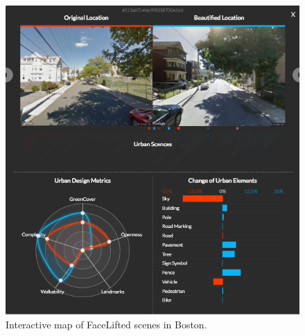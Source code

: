 

\begin{figure}[t!]
	\centering
	\includegraphics[width=\columnwidth]{Plot/UI.png}
	\caption{Interactive map of FaceLifted scenes in Boston.}
	\label{facelift-UI}
\end{figure}


